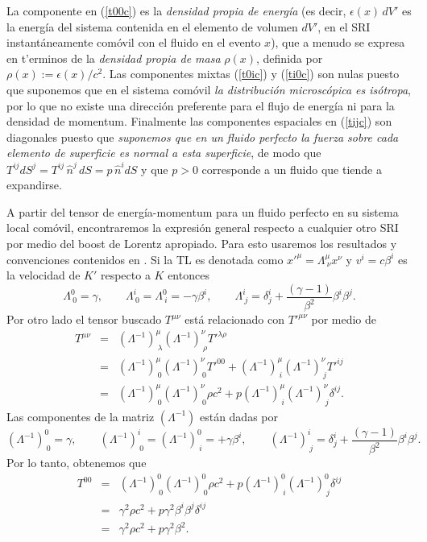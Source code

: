 La componente en (\ref{t00c}) es la \textit{densidad propia de energía} (es decir, $\epsilon(x)\,dV'$ es la energía del sistema contenida en el elemento de volumen $dV'$, en el SRI instantáneamente comóvil con el fluido en el evento $x$), que a menudo se expresa en t'erminos de la \textit{densidad propia de masa} $\rho(x)$, definida por $\rho(x):=\epsilon(x)/c^2$. Las componentes
mixtas (\ref{t0ic}) y (\ref{ti0c}) son nulas puesto que suponemos que en el sistema comóvil \textit{la distribución microscópica es isótropa}, por lo que no existe una dirección preferente para el flujo de energía ni para la densidad de momentum. Finalmente las componentes espaciales
en (\ref{tijc}) son diagonales puesto que \textit{suponemos que en un fluido
perfecto la fuerza sobre cada elemento de superficie es normal a esta
superficie}, de modo que $T^{ij}dS^j=T^{ij}\,\hat{n}^j\,dS=p\,\hat{n}^i dS$ y que $p>0$ corresponde a un fluido que tiende a expandirse.

A partir del tensor de energía-momentum para un fluido perfecto en su sistema local comóvil, encontraremos la expresión general respecto a cualquier
otro SRI por medio del boost de Lorentz apropiado. Para esto usaremos los resultados y convenciones contenidos en \cite{7}. Si la TL es denotada como $x'^\mu=\Lambda^\mu_{\ \nu}x^\nu$ y $v^i=c\beta^i$ es la velocidad de $K'$ respecto a $K$ entonces
\begin{equation}
 \Lambda^0_{\ 0}=\gamma, \qquad \Lambda^i_{\ 0}=\Lambda^0_{\ i}=-\gamma\beta^i, \qquad \Lambda^i_{\ j}=\delta^i_j
+\frac{(\gamma-1) }{\beta^2}\beta^i\beta^j .
\end{equation}
Por otro lado el tensor buscado $T^{\mu\nu}$ está relacionado con $T'^{\mu\nu}$ por medio de
\begin{eqnarray}
T^{\mu\nu}&=&(\Lambda^{-1})^\mu_{\ \lambda}(\Lambda^{-1})^\nu_{\ \rho}T'^{\lambda\rho}
\\
&=& (\Lambda^{-1})^\mu_{\ 0}(\Lambda^{-1})^\nu_{\ 0}T'^{00}+(\Lambda^{-1})^\mu_{\
i}(\Lambda^{-1})^\nu_{\ j}T'^{ij}\\
&=& (\Lambda^{-1})^\mu_{\ 0}(\Lambda^{-1})^\nu_{\ 0}\rho c^2+p(\Lambda^{-1})^\mu_{\
i}(\Lambda^{-1})^\nu_{\ j}\delta^{ij}.
\end{eqnarray}
Las componentes de la matriz $(\Lambda^{-1})$ están dadas por
\begin{equation}
(\Lambda^{-1})^0_{\ 0}=\gamma, \qquad (\Lambda^{-1})^i_{\ 0}=(\Lambda^{-1})^0_{\ i}=+\gamma\beta^i, \qquad (\Lambda^{-1})^i_{\ j}=\delta^i_j
+\frac{(\gamma-1) }{\beta^2}\beta^i\beta^j .
\end{equation}
Por lo tanto, obtenemos que
\begin{eqnarray}
T^{00}&=& (\Lambda^{-1})^0_{\ 0}(\Lambda^{-1})^0_{\ 0}\rho c^2+p(\Lambda^{-1})^0_{\ i}(\Lambda^{-1})^0_{\ j}\delta^{ij} \\
&=& \gamma^2\rho c^2+p\gamma^2\beta^i\beta^j\delta^{ij} \\
&=& \gamma^2\rho c^2+p\gamma^2\beta^2 .
\end{eqnarray}

